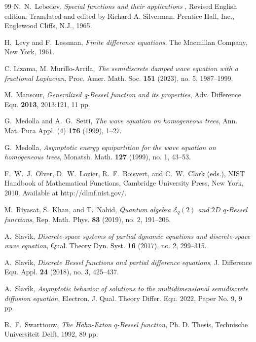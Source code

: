 \documentclass[12pt]{amsart}
\numberwithin{equation}{section}
\begin{document}
\begin{thebibliography}{99}
 N.~N.~Lebedev, \emph{Special functions and their applications}%
, Revised English edition. Translated and edited by Richard A. Silverman.
Prentice-Hall, Inc., Englewood Cliffs, N.J., 1965.

 H.~Levy and F.~Lessman, \emph{Finite difference equations},
The Macmillan Company, New York, 1961.

  C. Lizama, M. Murillo-Arcila, \emph{The semidiscrete damped wave equation with a fractional Laplacian}, Proc. Amer. Math. Soc. \textbf{151} (2023), no. 5, 1987--1999.

 M.~Mansour, \emph{Generalized q-Bessel function and its
properties}, Adv. Difference Equ. \textbf{2013}, 2013:121, 11 pp.

 G.~Medolla and A.~G.~Setti, \emph{The wave equation on
homogeneous trees}, Ann. Mat. Pura Appl. (4) \textbf{176} (1999), 1--27.

 G.~Medolla, \emph{Asymptotic energy equipartition for the
wave equation on homogeneous trees}, Monatsh. Math. \textbf{127} (1999), no.
1, 43--53.

 F.~W.~J.~Olver, D.~W.~Lozier, R.~F.~Boisvert, and C.~W.~Clark
(eds.), NIST Handbook of Mathematical Functions, Cambridge University Press,
New York, 2010. Available at http://dlmf.nist.gov/.

 M.~Riyasat, S.~Khan, and T.~Nahid, \emph{Quantum algebra $%
\mathcal{E}_q(2)$ and $2D$ $q$-Bessel functions}, Rep. Math. Phys. \textbf{83%
} (2019), no. 2, 191--206.


 A.~Slav\'{\i}k, \emph{Discrete-space systems of partial
dynamic equations and discrete-space wave equation}, Qual. Theory Dyn. Syst.
\textbf{16} (2017), no. 2, 299--315.

 A.~Slav\'{\i}k, \emph{Discrete Bessel functions and partial
difference equations}, J. Difference Equ. Appl. \textbf{24} (2018), no. 3,
425--437.

 A.~Slav\'{\i}k, \emph{Asymptotic behavior of solutions to
the multidimensional semidiscrete diffusion equation}, Electron. J. Qual.
Theory Differ. Equ. 2022, Paper No. 9, 9 pp.

 R.~F.~Swarttouw, \emph{The Hahn-Exton $q$-Bessel function},
Ph. D. Thesis, Technische Universiteit Delft, 1992, 89 pp.


\end{thebibliography}
\end{document}
